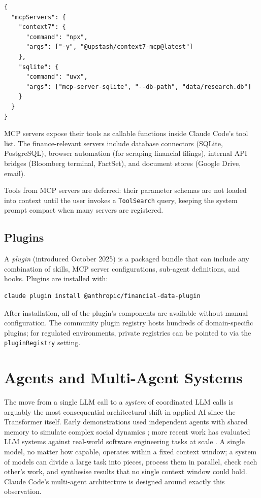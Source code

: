 \begin{verbatim}
{
  "mcpServers": {
    "context7": {
      "command": "npx",
      "args": ["-y", "@upstash/context7-mcp@latest"]
    },
    "sqlite": {
      "command": "uvx",
      "args": ["mcp-server-sqlite", "--db-path", "data/research.db"]
    }
  }
}
\end{verbatim}

MCP servers expose their tools as callable functions inside Claude Code's tool
list.  The finance-relevant servers include database connectors (SQLite,
PostgreSQL), browser automation (for scraping financial filings), internal API
bridges (Bloomberg terminal, FactSet), and document stores (Google Drive, email).

Tools from MCP servers are deferred: their parameter schemas are not loaded into
context until the user invokes a \texttt{ToolSearch} query, keeping the system
prompt compact when many servers are registered.

\subsection{Plugins}
\label{app:claude-code:plugins}

A \emph{plugin} (introduced October 2025) is a packaged bundle that can include
any combination of skills, MCP server configurations, sub-agent definitions, and
hooks.  Plugins are installed with:

\begin{verbatim}
claude plugin install @anthropic/financial-data-plugin
\end{verbatim}

After installation, all of the plugin's components are available without manual
configuration.  The community plugin registry hosts hundreds of domain-specific
plugins; for regulated environments, private registries can be pointed to via
the \texttt{pluginRegistry} setting.

\section{Agents and Multi-Agent Systems}
\label{app:claude-code:agents}

\begin{context}
The move from a single LLM call to a \emph{system} of coordinated LLM calls is
arguably the most consequential architectural shift in applied AI since the
Transformer itself.  Early demonstrations used independent agents with shared
memory to simulate complex social dynamics \citep{park2023generative}; more
recent work has evaluated LLM systems against real-world software engineering
tasks at scale \citep{jimenez2024swebench}.  A single model, no matter how
capable, operates within a fixed context window; a system of models can divide
a large task into pieces, process them in parallel, check each other's work, and
synthesise results that no single context window could hold.  Claude Code's
multi-agent architecture is designed around exactly this observation.
\end{context}

